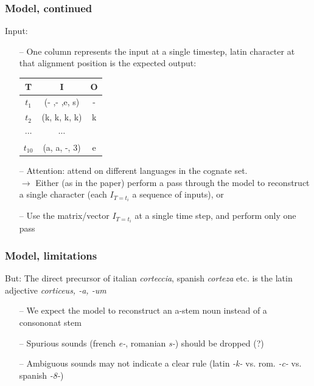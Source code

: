 \documentclass[11pt]{beamer}
\begin{document}
\begin{frame}
    \frametitle{Model, continued}
    Input:
    \begin{itemize}
        \item[--] One column represents the input at a single timestep, latin character at that alignment position is the expected output:
        \newline
        \begin{center}
        \begin{tabular}{c|c|c}
            \textbf{T} & \textbf{I} & \textbf{O} \\
            \hline
            $t_{1}$ & (- ,- ,e, s) & - \\
            $t_{2}$ & (k, k, k, k) & k \\
            $\cdots$ & $\cdots$ \\
            $t_{10}$ & (a, a, -, 3) & e
        \end{tabular} 
        \end{center}
        \item[--] Attention: \cite{meloni_ab_2019} attend on different languages in the cognate set. \\
        $\rightarrow$ Either (as in the paper) perform a pass through the model to reconstruct a single character (each $I_{T=t_{i}}$ a sequence of inputs), or 
        \item[--] Use the matrix/vector $I_{T=t_{i}}$ at a single time step, and perform only one pass
    \end{itemize}
\end{frame}

\begin{frame}
    \frametitle{Model, limitations}
    But: The direct precursor of italian \textit{corteccia}, spanish \textit{corteza} etc. is the latin adjective \textit{corticeus, -a, -um}
    \begin{itemize}
        \item[--] We expect the model to reconstruct an a-stem noun instead of a consononat stem 
        \item[--] Spurious sounds (french \textit{e-}, romanian \textit{s-}) should be dropped (?)
        \item[--] Ambiguous sounds may not indicate a clear rule (latin \textit{-k-} vs. rom. \textit{-c-} vs. spanish \textit{-8-})  
    \end{itemize}
\end{frame}
\end{document}
